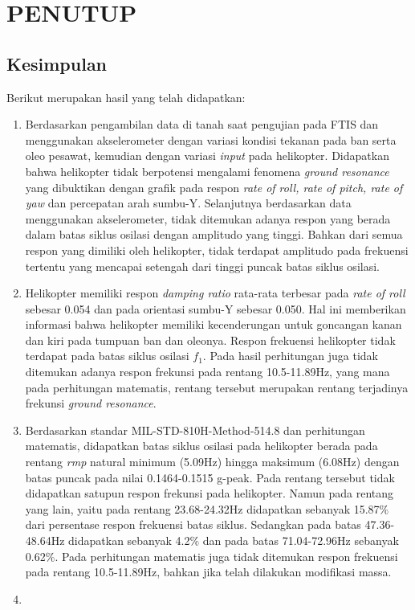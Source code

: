 \chapter{PENUTUP}
\label{chap:penutup}


\section{Kesimpulan}
\label{sec:kesimpulan}

Berikut merupakan hasil yang telah didapatkan:

\begin{enumerate}[nolistsep]

  \item Berdasarkan pengambilan data di tanah saat pengujian pada FTIS dan menggunakan akselerometer dengan variasi kondisi tekanan pada ban serta oleo pesawat, kemudian dengan variasi \textit{input} pada helikopter. Didapatkan bahwa helikopter tidak berpotensi mengalami fenomena \textit{ground resonance} yang dibuktikan dengan grafik pada respon \textit{rate of roll, rate of pitch, rate of yaw} dan percepatan arah sumbu-Y. Selanjutnya berdasarkan data menggunakan akselerometer, tidak ditemukan adanya respon yang berada dalam batas siklus osilasi dengan amplitudo yang tinggi. Bahkan dari semua respon yang dimiliki oleh helikopter, tidak terdapat amplitudo pada frekuensi tertentu yang mencapai setengah dari tinggi puncak batas siklus osilasi.

  \item Helikopter memiliki respon \textit{damping ratio} rata-rata terbesar pada \textit{rate of roll} sebesar 0.054 dan pada orientasi sumbu-Y sebesar 0.050. Hal ini memberikan informasi bahwa helikopter memiliki kecenderungan untuk goncangan kanan dan kiri pada tumpuan ban dan oleonya. Respon frekuensi helikopter tidak terdapat pada batas siklus osilasi $f_1$. Pada hasil perhitungan juga tidak ditemukan adanya respon frekunsi pada rentang 10.5-11.89Hz, yang mana pada perhitungan matematis, rentang tersebut merupakan rentang terjadinya frekunsi \textit{ground resonance}.

  \item Berdasarkan standar MIL-STD-810H-Method-514.8 dan perhitungan matematis, didapatkan batas siklus osilasi pada helikopter berada pada rentang \textit{rmp} natural minimum (5.09Hz) hingga maksimum (6.08Hz) dengan batas puncak pada nilai 0.1464-0.1515 g-peak. Pada rentang tersebut tidak didapatkan satupun respon frekunsi pada helikopter. Namun pada rentang yang lain, yaitu pada rentang 23.68-24.32Hz didapatkan sebanyak 15.87$\%$ dari persentase respon frekuensi batas siklus. Sedangkan pada batas 47.36-48.64Hz didapatkan sebanyak 4.2$\%$ dan pada batas 71.04-72.96Hz sebanyak 0.62$\%$. Pada perhitungan matematis juga tidak ditemukan respon frekuensi pada rentang 10.5-11.89Hz, bahkan jika telah dilakukan modifikasi massa.
  
  \item 

\end{enumerate}

